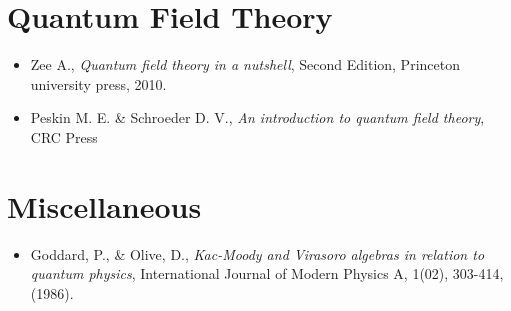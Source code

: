 \section*{Quantum Field Theory}
\begin{itemize}
    \item  Zee A., \textit{Quantum field theory in a nutshell}, Second Edition, Princeton university press, 2010.
    \item Peskin M. E. \& Schroeder D. V., \textit{An introduction to quantum field theory}, CRC Press
\end{itemize}

\section*{Miscellaneous}
\begin{itemize}
    \item Goddard, P., \& Olive, D., \textit{Kac-Moody and Virasoro algebras in relation to quantum physics}, International Journal of Modern Physics A, 1(02), 303-414, (1986).
\end{itemize}